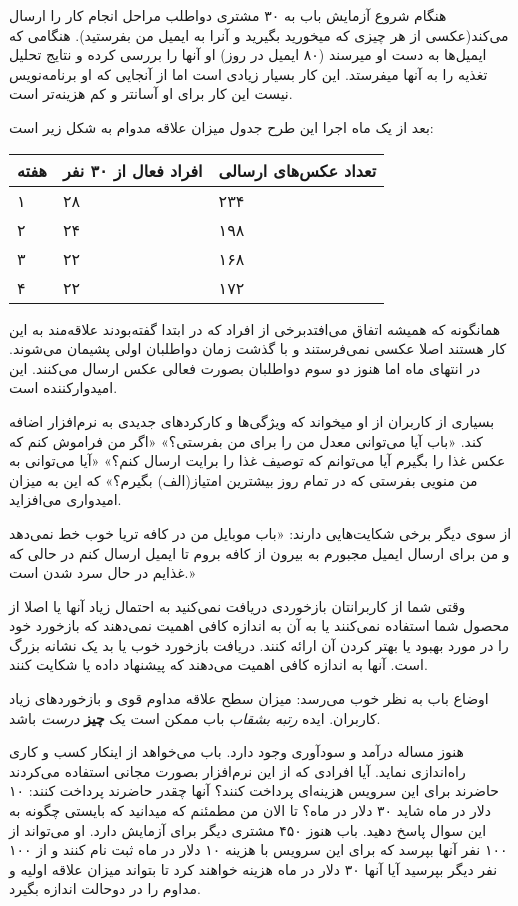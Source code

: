 هنگام شروع آزمایش باب به ۳۰ مشتری دواطلب مراحل انجام کار را ارسال
می‌کند(عکسی از هر چیزی که میخورید بگیرید و آنرا به ایمیل من بفرستید).
هنگامی که ایمیل‌ها به دست او میرسند (۸۰ ایمیل در روز) او آنها را بررسی
کرده و نتایج تحلیل تغذیه را به آنها میفرستد. این کار بسیار زیادی است اما
از آنجایی که او برنامه‌نویس نیست این کار برای او آسانتر و کم هزینه‌تر
است.

بعد از یک ماه اجرا این طرح جدول میزان علاقه مدوام به شکل زیر است:

\begin{longtable}[c]{@{}lll@{}}
\toprule
هفته & افراد فعال از ۳۰ نفر & تعداد عکس‌های ارسالی\tabularnewline
\midrule
\endhead
۱ & ۲۸ & ۲۳۴\tabularnewline
۲ & ۲۴ & ۱۹۸\tabularnewline
۳ & ۲۲ & ۱۶۸\tabularnewline
۴ & ۲۲ & ۱۷۲\tabularnewline
\bottomrule
\end{longtable}

همانگونه که همیشه اتفاق می‌افتدبرخی از افراد که در ابتدا گفته‌بودند
علاقه‌مند به این کار هستند اصلا عکسی نمی‌فرستند و با گذشت زمان دواطلبان
اولی پشیمان می‌شوند. در انتهای ماه اما هنوز دو سوم دواطلبان بصورت فعالی
عکس ارسال می‌کنند. این امیدوارکننده است.

بسیاری از کاربران از او میخواند که ویژگی‌ها و کارکردهای جدیدی به
نرم‌افزار اضافه کند. «باب آیا می‌توانی معدل من را برای من بفرستی؟» «اگر
من فراموش کنم که عکس غذا را بگیرم آیا می‌توانم که توصیف غذا را برایت
ارسال کنم؟» «آیا می‌توانی به من منویی بفرستی که در تمام روز بیشترین
امتیاز(الف) بگیرم؟» که این به میزان امیدواری می‌افزاید.

از سوی دیگر برخی شکایت‌هایی دارند: «باب موبایل من در کافه تریا خوب خط
نمی‌دهد و من برای ارسال ایمیل مجبورم به بیرون از کافه بروم تا ایمیل
ارسال کنم در حالی که غذایم در حال سرد شدن است.»

وقتی شما از کاربرانتان بازخوردی دریافت نمی‌کنید به احتمال زیاد آنها یا
اصلا از محصول شما استفاده نمی‌کنند یا به آن به اندازه کافی اهمیت
نمی‌دهند که بازخورد خود را در مورد بهبود یا بهتر کردن آن ارائه کنند.
دریافت بازخورد خوب یا بد یک نشانه بزرگ است. آنها به اندازه کافی اهمیت‌
می‌دهند که پیشنهاد داده یا شکایت کنند.

اوضاع باب به نظر خوب می‌رسد: میزان سطح علاقه مداوم قوی و بازخوردهای زیاد
کاربران. ایده \emph{رتبه بشقاب} باب ممکن است یک \textbf{چیز} \emph{درست}
باشد.

هنوز مساله درآمد و سودآوری وجود دارد. باب می‌خواهد از اینکار کسب و کاری
راه‌اندازی نماید. آیا افرادی که از این نرم‌افزار بصورت مجانی استفاده
می‌کردند حاضرند برای این سرویس هزینه‌ای پرداخت کنند؟ آنها چقدر حاضرند
پرداخت کنند: ۱۰ دلار در ماه شاید ۳۰ دلار در ماه؟ تا الان من مطمئنم که
میدانید که بایستی چگونه به این سوال پاسخ دهید. باب هنوز ۴۵۰ مشتری دیگر
برای آزمایش دارد. او می‌تواند از ۱۰۰ نفر آنها بپرسد که برای این سرویس با
هزینه ۱۰ دلار در ماه ثبت نام کنند و از ۱۰۰ نفر دیگر بپرسید آیا آنها ۳۰
دلار در ماه هزینه خواهند کرد تا بتواند میزان علاقه اولیه و مداوم را در
دوحالت اندازه بگیرد.

